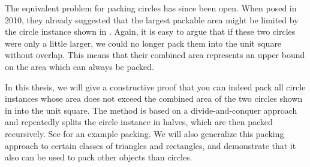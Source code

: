 \documentclass[a4paper,style=print,oneside,bibliography=totoc,nexus,lnum,extramargin]{tubsbook}
\begin{document}

The equivalent problem for packing circles has since been open.
When \textcite{DFL2010circle} posed  in 2010, they already suggested that the largest packable area might be limited by the circle instance shown in . Again, it is easy to argue that if these two circles were only a little larger, we could no longer pack them into the unit square without overlap. This means that their combined area represents an upper bound on the area which can always be packed.


In this thesis, we will give a constructive proof that you can indeed pack all circle instances whose area does not exceed the combined area of the two circles shown in  into the unit square.
The method is based on a divide-and-conquer approach and repeatedly splits the circle instance in halves, which are then packed recursively.
See  for an example packing.
We will also generalize this packing approach to certain classes of triangles and rectangles, and demonstrate that it also can be used to pack other objects than circles.





\end{document}
